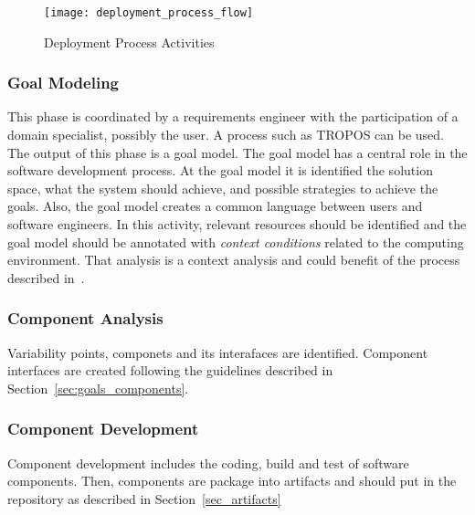 \label{sub:Proposal}
\begin{figure*}[!htb]
  \centering
  \texttt{[image: deployment\_process\_flow]}
  \caption{Deployment Process Activities}
\label{fig:deployment_process_flow}
\end{figure*}

\subsubsection{Goal Modeling}
This phase is coordinated by a requirements engineer with the participation of a domain specialist, possibly the user.
A process such as TROPOS can be used. The output of this phase is a goal model.
The goal model has a central role in the software development process. At the goal model it is identified the solution space, what the system should achieve, and possible strategies to achieve the goals. Also, the goal model creates a common language between users and software engineers.
In this activity, relevant resources should be identified and the goal model should be annotated with \emph{context conditions} related to the computing environment. That analysis is a context analysis and could benefit of the process described in~\cite{ali_goal-based_2010}.

\subsubsection{Component Analysis}

Variability points, componets and its interafaces are identified. Component interfaces are created following the guidelines described in Section~\ref{sec:goals_components}.

\subsubsection{Component Development}

Component development includes the coding, build and test of software components.
Then, components are package into artifacts and should put in the repository as described in Section~\ref{sec_artifacts}
